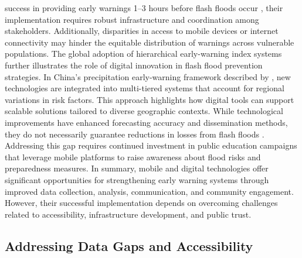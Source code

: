 success in providing early warnings 1–3 hours before flash floods occur \citep{AlRawas2024}, their implementation requires robust infrastructure and coordination among stakeholders. Additionally, disparities in access to mobile devices or internet connectivity may hinder the equitable distribution of warnings across vulnerable populations. The global adoption of hierarchical early-warning index systems further illustrates the role of digital innovation in flash flood prevention strategies. In China's precipitation early-warning framework described by \citep{Liu2018}, new technologies are integrated into multi-tiered systems that account for regional variations in risk factors. This approach highlights how digital tools can support scalable solutions tailored to diverse geographic contexts. While technological improvements have enhanced forecasting accuracy and dissemination methods, they do not necessarily guarantee reductions in losses from flash floods \citep{Terti2017}. Addressing this gap requires continued investment in public education campaigns that leverage mobile platforms to raise awareness about flood risks and preparedness measures. In summary, mobile and digital technologies offer significant opportunities for strengthening early warning systems through improved data collection, analysis, communication, and community engagement. However, their successful implementation depends on overcoming challenges related to accessibility, infrastructure development, and public trust.

\subsection{Addressing Data Gaps and Accessibility}

